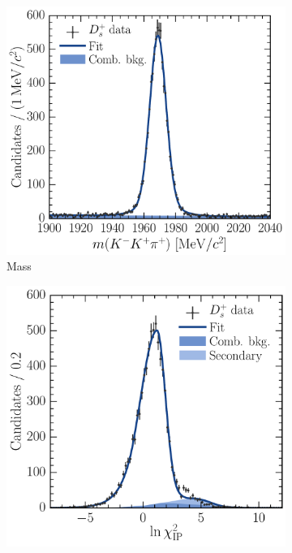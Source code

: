 \begin{figure}
  \begin{subfigure}[b]{0.5\textwidth}
    \centering
    \includegraphics[width=\textwidth]{figures/production/fitting/DsToKKpi_mass_fit_pT_6_y_1}
    \caption{Mass}
    \label{fig:prod:fitting:DsToKKpi:mass_high_sig}
  \end{subfigure}
  \begin{subfigure}[b]{0.5\textwidth}
    \centering
    \includegraphics[width=\textwidth]{figures/production/fitting/DsToKKpi_ipchisq_fit_pT_6_y_1}

\end{subfigure}
\end{figure}
